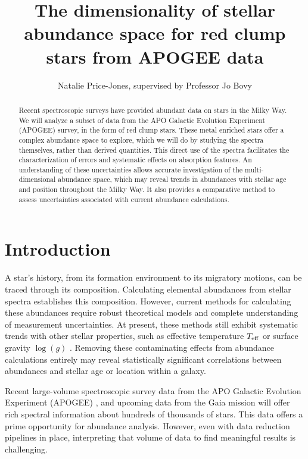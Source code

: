 \documentclass[preprint]{aastex}
\begin{document}
\title{The dimensionality of stellar abundance space for red clump stars from APOGEE data}
\author{Natalie Price-Jones, supervised by Professor Jo Bovy}

\begin{abstract}
Recent spectroscopic surveys have provided abundant data on stars in the Milky Way. We will analyze a subset of data from the APO Galactic Evolution Experiment (APOGEE) survey, in the form of red clump stars. These metal enriched stars offer a complex abundance space to explore, which we will do by studying the spectra themselves, rather than derived quantities. This direct use of the spectra facilitates the characterization of errors and systematic effects on absorption features. An understanding of these uncertainties allows accurate investigation of the multi-dimensional abundance space, which may reveal trends in abundances with stellar age and position throughout the Milky Way. It also provides a comparative method to assess uncertainties associated with current abundance calculations.

\end{abstract}

\section{Introduction}
\label{sec:back}
A star's history, from its formation environment to its migratory motions, can be traced through its composition. Calculating elemental abundances from stellar spectra establishes this composition. However, current methods for calculating these abundances require robust theoretical models and complete understanding of measurement uncertainties. At present, these methods still exhibit systematic trends with other stellar properties, such as effective temperature $T_{\rm eff}$ or surface gravity $\log(g)$ \citep{holtzman2015}. Removing these contaminating effects from abundance calculations entirely may reveal statistically significant correlations between abundances and stellar age or location within a galaxy. 

Recent large-volume spectroscopic survey data from the APO Galactic Evolution Experiment (APOGEE) \citep{APOGEE}, and upcoming data from the Gaia mission \citep{GAIA} will offer rich spectral information about hundreds of thousands of stars. This data offers a prime opportunity for abundance analysis. However, even with data reduction pipelines in place, interpreting that volume of data to find meaningful results is challenging. 
\end{document}
